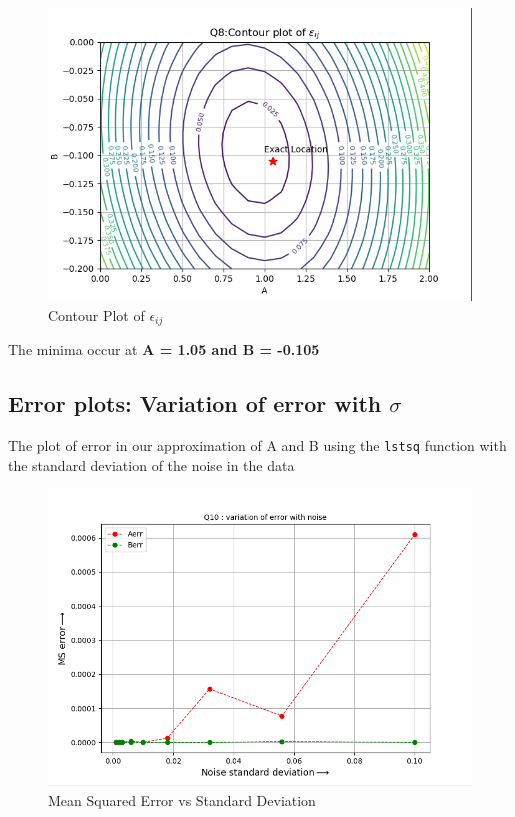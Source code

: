 \documentclass[11pt, a4paper]{article}
\begin{document}
            \begin{figure}[H]
                \centering
                \includegraphics[scale=0.5]{q8_plot.png}  %
                \caption{Contour Plot of $\epsilon_{ij}$}
                \label{fig:contourPlot}
            \end{figure}

            The minima occur at \textbf{A = 1.05 and B = -0.105}






           

        \subsection{Error plots: Variation of error with $\sigma$}
        
            The plot of error in our approximation of A and B using the \texttt{lstsq} function with the standard deviation of the noise in the data
            \begin{figure}[H]
                \centering
                \includegraphics[scale=0.5]{q10_plot.png}  %
                \caption{Mean Squared Error vs Standard Deviation}
                \label{fig:errorSTD}
            \end{figure}
\end{document}
